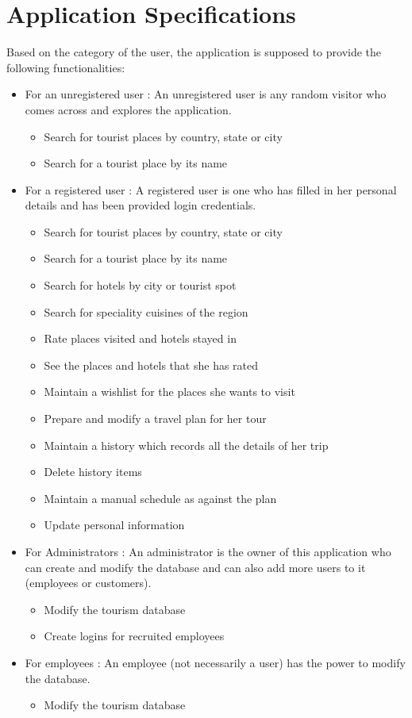 \documentclass[11pt]{article}
\begin{document}
\section{Application Specifications}
Based on the category of the user, the application is supposed to provide the following functionalities:
\begin{itemize}
\item For an unregistered user : An unregistered user is any random visitor who comes across and explores the application.
\begin{itemize}
\item Search for tourist places by country, state or city
\item Search for a tourist place by its name
\end{itemize}
\item For a registered user : A registered user is one who has filled in her personal details and has been provided login credentials.
\begin{itemize}
\item Search for tourist places by country, state or city
\item Search for a tourist place by its name
\item Search for hotels by city or tourist spot
\item Search for speciality cuisines of the region
\item Rate places visited and hotels stayed in
\item See the places and hotels that she has rated 
\item Maintain a wishlist for the places she wants to visit
\item Prepare and modify a travel plan for her tour
\item Maintain a history which records all the details of her trip
\item Delete history items
\item Maintain a manual schedule as against the plan
\item Update personal information
\end{itemize}
\item For Administrators : An administrator is the owner of this application who can create and modify the database and can also add more users to it (employees or customers).
\begin{itemize}
\item Modify the tourism database
\item Create logins for recruited employees
\end{itemize}
\item For employees : An employee (not necessarily a user) has the power to modify the database.
\begin{itemize}
\item Modify the tourism database
\end{itemize}
\end{itemize}
\end{document}
